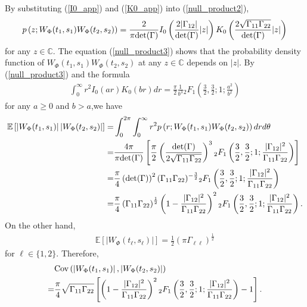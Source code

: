 \documentclass{amsart}
\begin{document}
By substituting (\ref{I0_app}) and  (\ref{K0_app}) into (\ref{null_product2}),
\begin{align}\label{null_product3}
p\left(z; W_{\Phi}(t_{1},s_{1})W_{\Phi}(t_{2},s_{2})\right)
=
\frac{2}{\pi\textup{det}(\Gamma)}I_{0}\left(\frac{2|\Gamma_{12}|}{\det(\Gamma)}|z|\right)
K_{0}\left(\frac{2\sqrt{\Gamma_{11}\Gamma_{22}}}{\det(\Gamma)}|z|\right)
\end{align}
for any $z\in \mathbb{C}$.
The equation (\ref{null_product3}) shows that the probability density function of $W_{\Phi}(t_{1},s_{1})W_{\Phi}(t_{2},s_{2})$
at any $z\in \mathbb{C}$
depends on $|z|$.
By (\ref{null_product3}) and the formula \cite[p. 684]{gradshteyn2014table}
\begin{align*}
\int_{0}^{\infty}r^{2}I_{0}(ar)K_{0}(br)dr = \frac{\pi}{2}\frac{1}{b^{3}}{}_2F_1\left(\frac{3}{2},\frac{3}{2};1;\frac{a^2}{b^2}\right)
\end{align*}
for any $a\geq 0$ and $b>a$,we have
\begin{align}\notag%
\mathbb{E}\left[\left|W_{\Phi}(t_{1},s_{1})\right|\left|W_{\Phi}(t_{2},s_{2})\right|\right]
=&\int_{0}^{2\pi}\int_{0}^{\infty}r^{2}p\left(r; W_{\Phi}(t_{1},s_{1})W_{\Phi}(t_{2},s_{2})\right)drd\theta
\\\notag=&\frac{4\pi}{\pi\textup{det}(\Gamma)}\left[\frac{\pi}{2}\left(\frac{\textup{det}(\Gamma)}
{2\sqrt{\Gamma_{11}\Gamma_{22}}}\right)^{3}
{}_2F_1\left(\frac{3}{2},\frac{3}{2};1;\frac{|\Gamma_{12}|^{2}}{\Gamma_{11}\Gamma_{22}}\right)
\right]
\\\notag=&
\frac{\pi}{4}\left(\textup{det}(\Gamma)\right)^{2}
(\Gamma_{11}\Gamma_{22})^{-\frac{3}{2}}
{}_2F_1\left(\frac{3}{2},\frac{3}{2};1;\frac{|\Gamma_{12}|^{2}}{\Gamma_{11}\Gamma_{22}}\right)
\\\notag=&
\frac{\pi}{4}\left(\Gamma_{11}\Gamma_{22}\right)^{\frac{1}{2}}
\left(1-\frac{|\Gamma_{12}|^{2}}{\Gamma_{11}\Gamma_{22}}\right)^{2}
{}_2F_1\left(\frac{3}{2},\frac{3}{2};1;\frac{|\Gamma_{12}|^{2}}{\Gamma_{11}\Gamma_{22}}\right).
\end{align}
On the other hand,
\begin{align}\label{EabsW}
\mathbb{E}\left[\left|W_{\Phi}(t_{\ell},s_{\ell})\right|\right]=\frac{1}{2}(\pi\Gamma_{\ell\ell})^{\frac{1}{2}}
\end{align}
for  $\ell\in\{1,2\}$. Therefore,
\begin{align}\label{Cov_abs_W}
&\textup{Cov}\left(\left|W_{\Phi}(t_{1},s_{1})\right|,\left|W_{\Phi}(t_{2},s_{2})\right|\right)
\\\notag=&\frac{\pi}{4}\sqrt{\Gamma_{11}\Gamma_{22}}
\left[\left(1-\frac{|\Gamma_{12}|^{2}}{\Gamma_{11}\Gamma_{22}}\right)^2
{}_2F_1\left(\frac{3}{2},\frac{3}{2};1;\frac{|\Gamma_{12}|^{2}}{\Gamma_{11}\Gamma_{22}}\right)-1\right].
\end{align}
\end{document}
